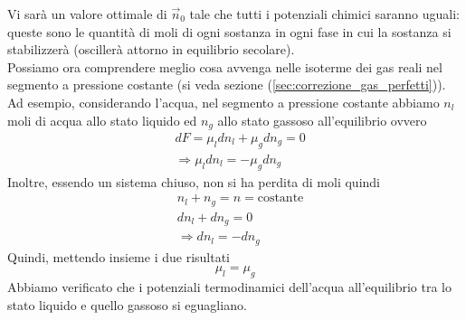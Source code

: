 \documentclass[10pt,a4paper]{article}
\begin{document}
Vi sarà un valore ottimale di $\vec{n}_0$ tale che tutti i potenziali chimici saranno uguali: queste sono le quantità di moli di ogni sostanza in ogni fase in cui la sostanza si stabilizzerà (oscillerà attorno in equilibrio secolare).\\
Possiamo ora comprendere meglio cosa avvenga nelle isoterme dei gas reali nel segmento a pressione costante (si veda sezione (\ref{sec:correzione_gas_perfetti})). Ad esempio, considerando l'acqua, nel segmento a pressione costante abbiamo \(n_l\) moli di acqua allo stato liquido ed \(n_g\) allo stato gassoso all'equilibrio ovvero 
\begin{align*}
	&dF= \mu_l dn_l+ \mu_g dn_g = 0\\
	&\Rightarrow \mu_l dn_l = -\mu_g dn_g
\end{align*}
Inoltre, essendo un sistema chiuso, non si ha perdita di moli quindi 
\begin{align*}
	&n_l + n_g = n = \text{costante}\\
	&dn_l + dn_g = 0\\
	&\Rightarrow dn_l = -dn_g
\end{align*}
Quindi, mettendo insieme i due risultati
\[\mu_l = \mu_g\]
Abbiamo verificato che i potenziali termodinamici dell'acqua all'equilibrio tra lo stato liquido e quello gassoso si eguagliano.
\end{document}
